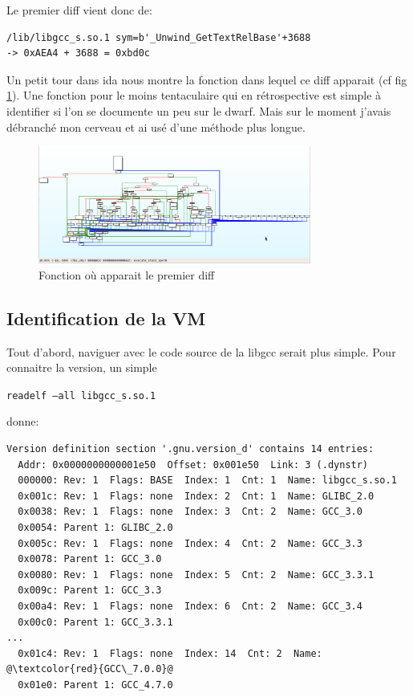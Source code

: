 \documentclass[14pt]{article}
\newcommand{\inlinebox}[2]{%
\colorbox{bg}{%
\parbox[b][0.6em]{\widthof{\texttt{#2}}}{\texttt{#2}}
}
}
\newcommand{\inlinebash}[1]{ \inlinebox{bash}{#1} }
\theoremstyle{definition}
\begin{document}
Le premier diff vient donc de:
\begin{verbatim}
/lib/libgcc_s.so.1 sym=b'_Unwind_GetTextRelBase'+3688
-> 0xAEA4 + 3688 = 0xbd0c
\end{verbatim}

Un petit tour dans ida nous montre la fonction dans lequel ce diff apparait (cf fig \ref{fig:p2_ida_execute_stack_op}). Une fonction pour le moins tentaculaire qui en rétrospective est simple à identifier si l'on se documente un peu sur le dwarf.
Mais sur le moment j'avais débranché mon cerveau et ai usé d'une méthode plus longue.

\begin{figure}[H]
\centering
  \includegraphics[width=0.8\textwidth]{./screenshots/p2_ida_execute_stack_op.png}
  \caption{Fonction où apparait le premier diff}
  \label{fig:p2_ida_execute_stack_op}
\end{figure}


\subsection{Identification de la VM}
Tout d'abord, naviguer avec le code source de la libgcc serait plus simple. Pour connaitre la version, un simple \inlinebash{readelf --all libgcc_s.so.1} donne:

\begin{tcolorbox}
\begin{lstlisting}[escapechar=@]
Version definition section '.gnu.version_d' contains 14 entries:
  Addr: 0x0000000000001e50  Offset: 0x001e50  Link: 3 (.dynstr)
  000000: Rev: 1  Flags: BASE  Index: 1  Cnt: 1  Name: libgcc_s.so.1
  0x001c: Rev: 1  Flags: none  Index: 2  Cnt: 1  Name: GLIBC_2.0
  0x0038: Rev: 1  Flags: none  Index: 3  Cnt: 2  Name: GCC_3.0
  0x0054: Parent 1: GLIBC_2.0
  0x005c: Rev: 1  Flags: none  Index: 4  Cnt: 2  Name: GCC_3.3
  0x0078: Parent 1: GCC_3.0
  0x0080: Rev: 1  Flags: none  Index: 5  Cnt: 2  Name: GCC_3.3.1
  0x009c: Parent 1: GCC_3.3
  0x00a4: Rev: 1  Flags: none  Index: 6  Cnt: 2  Name: GCC_3.4
  0x00c0: Parent 1: GCC_3.3.1
...
  0x01c4: Rev: 1  Flags: none  Index: 14  Cnt: 2  Name: @\textcolor{red}{GCC\_7.0.0}@
  0x01e0: Parent 1: GCC_4.7.0
\end{lstlisting}
\end{tcolorbox}
\end{document}
